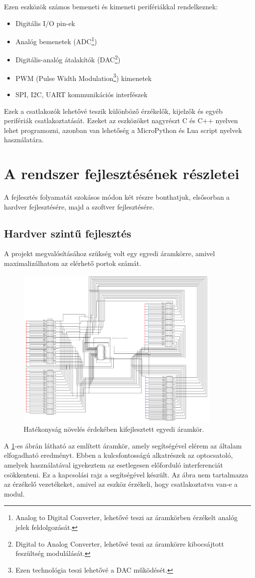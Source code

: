 \documentclass{thesis-ekf}
\theoremstyle{definition}
\theoremstyle{remark}
\begin{document}
	Ezen eszközök számos bemeneti és kimeneti perifériákkal rendelkeznek:
	\begin{itemize}
		\item Digitális I/O pin-ek
		\item Analóg bemenetek (ADC\footnote{Analog to Digital Converter, lehetővé teszi az áramkörben érzékelt analóg jelek feldolgozását.})
		\item Digitális-analóg átalakítók (DAC\footnote{Digital to Analog Converter, lehetővé teszi az áramkörre kibocsájtott feszültség modulálását.})
		\item PWM (Pulse Width Modulation\footnote{Ezen technológia teszi lehetővé a DAC működését.}) kimenetek
		\item SPI, I2C, UART kommunikációs interfészek
	\end{itemize}
	Ezek a csatlakozók lehetővé teszik különböző érzékelők, kijelzők és egyéb perifériák csatlakoztatását.
	Ezeket az eszközöket nagyrészt C és C++ nyelven lehet programozni, azonban van lehetőség a MicroPython és Lua script nyelvek használatára.
	\section{A rendszer fejlesztésének részletei}
	A fejlesztés folyamatát szokásos módon két részre bonthatjuk, elsősorban a hardver fejlesztésére, majd a szoftver fejlesztésére.
	\subsection{Hardver szintű fejlesztés}
	A projekt megvalósításához szükség volt egy egyedi áramkörre, amivel maximalizálhatom az elérhető portok számát.
	\begin{figure}[!ht]
		\centering
		\includegraphics[width=10cm]{circuit}
		\caption{Hatékonyság növelés érdekében kifejlesztett egyedi áramkör.}
		\label{img_circ}
	\end{figure}
	A \ref{img_circ}-es ábrán látható az említett áramkör, amely segítségével elérem az általam elfogadható eredményt. Ebben a kulcsfontosságú alkatrészek az optocsatoló, amelyek használatával igyekeztem  az esetlegesen előforduló interferenciát csökkenteni.
	Ez a kapcsolási rajz a \href{https://www.circuit-diagram.org/}{\color{blue}{Circuit Diagram}} segítségével készült.
	Az ábra nem tartalmazza az érzékelő vezetékeket, amivel az eszköz érzékeli, hogy csatlakoztatva van-e a modul.
	
\end{document}
